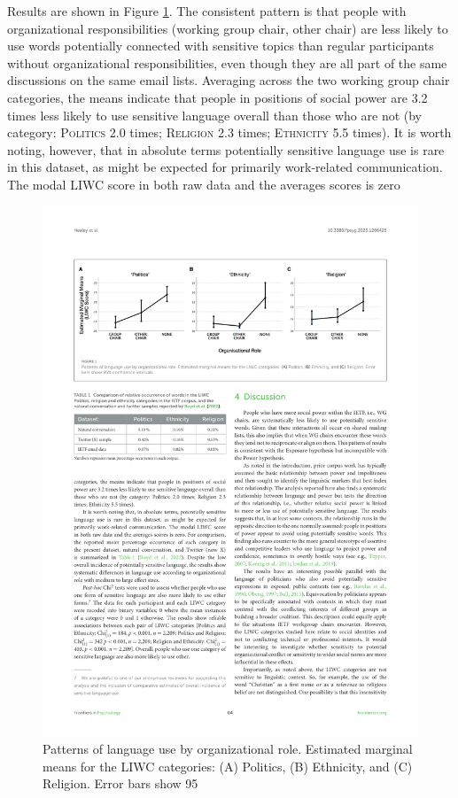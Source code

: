 \documentclass[twocolumn,10pt]{article}
\newlength{\figureWidthTwoColumn}
\newcommand{\liwc}[1]{\textsc{#1}}
\begin{document}
Results are shown in Figure \ref{fig:sensitive}. The consistent pattern
is that people with organizational responsibilities (working group chair,
other chair) are less likely to use words potentially connected with
sensitive topics than regular participants without organizational
responsibilities, even though they are all part of the same discussions
on the same email lists.
Averaging across the two working group chair categories, the means indicate
that people in positions of social power are 3.2 times less likely to use
sensitive language overall than those who are not (by category:
\liwc{Politics} 2.0 times; \liwc{Religion} 2.3 times; \liwc{Ethnicity} 5.5
times).
It is worth noting, however, that in absolute terms potentially sensitive
language use is rare in this dataset, as might be expected for primarily
work-related communication. The modal LIWC score in both raw data and the
averages scores is zero

\begin{figure}[t]
  \centering
  \includegraphics[width=\figureWidthTwoColumn]{figures-prev/frontiers/sensitive.pdf}
  \caption{
    Patterns of language use by organizational role. Estimated marginal
    means for the LIWC categories: (A) Politics, (B) Ethnicity, and (C)
    Religion. Error bars show 95%
  }
  \label{fig:sensitive}
\end{figure}
\end{document}
